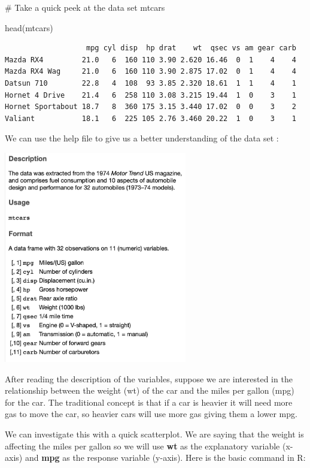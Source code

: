 \documentclass[
  letterpaper,
  DIV=11,
  numbers=noendperiod]{scrreprt}
\newenvironment{Shaded}{\begin{snugshade}}{\end{snugshade}}
\newcommand{\CommentTok}[1]{\textcolor[rgb]{0.37,0.37,0.37}{#1}}
\newcommand{\FunctionTok}[1]{\textcolor[rgb]{0.28,0.35,0.67}{#1}}
\newcommand{\NormalTok}[1]{\textcolor[rgb]{0.00,0.23,0.31}{#1}}
\begin{document}
\begin{Shaded}
\begin{Highlighting}[]
\CommentTok{\# Take a quick peek at the data set mtcars}

\FunctionTok{head}\NormalTok{(mtcars)}
\end{Highlighting}
\end{Shaded}

\begin{verbatim}
                   mpg cyl disp  hp drat    wt  qsec vs am gear carb
Mazda RX4         21.0   6  160 110 3.90 2.620 16.46  0  1    4    4
Mazda RX4 Wag     21.0   6  160 110 3.90 2.875 17.02  0  1    4    4
Datsun 710        22.8   4  108  93 3.85 2.320 18.61  1  1    4    1
Hornet 4 Drive    21.4   6  258 110 3.08 3.215 19.44  1  0    3    1
Hornet Sportabout 18.7   8  360 175 3.15 3.440 17.02  0  0    3    2
Valiant           18.1   6  225 105 2.76 3.460 20.22  1  0    3    1
\end{verbatim}

We can use the help file to give us a better understanding of the data
set :

\includegraphics[width=0.6\textwidth,height=\textheight]{./images/AST_1.jpg}

After reading the description of the variables, suppose we are
interested in the relationship between the weight (wt) of the car and
the miles per gallon (mpg) for the car. The traditional concept is that
if a car is heavier it will need more gas to move the car, so heavier
cars will use more gas giving them a lower mpg.

We can investigate this with a quick scatterplot. We are saying that the
weight is affecting the miles per gallon so we will use \textbf{wt} as
the explanatory variable (x-axis) and \textbf{mpg} as the response
variable (y-axis). Here is the basic command in R:
\end{document}
